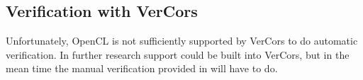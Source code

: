 \subsection{Verification with VerCors}
Unfortunately, OpenCL is not sufficiently supported by VerCors to do automatic verification.
In further research support could be built into VerCors, but in the mean time the manual verification provided in  will have to do.
